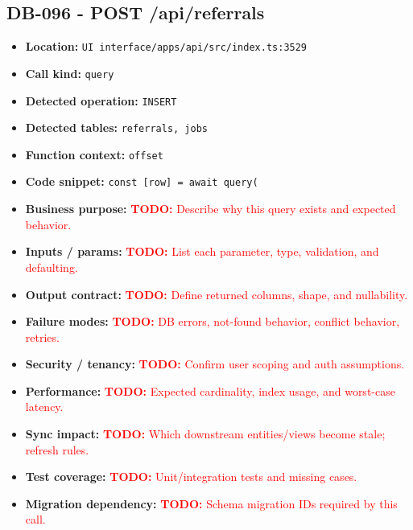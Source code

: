 \documentclass[11pt]{article}
\newcommand{\todoitem}[1]{\textcolor{red}{\textbf{TODO:} #1}}
\begin{document}
\subsection{DB-096 - POST /api/referrals}
\begin{itemize}[leftmargin=1.5em]
\item \textbf{Location:} \texttt{UI interface/apps/api/src/index.ts:3529}
\item \textbf{Call kind:} \texttt{query}
\item \textbf{Detected operation:} \texttt{INSERT}
\item \textbf{Detected tables:} \texttt{referrals, jobs}
\item \textbf{Function context:} \texttt{offset}
\item \textbf{Code snippet:} \texttt{const [row] = await query(}
\item \textbf{Business purpose:} \todoitem{Describe why this query exists and expected behavior.}
\item \textbf{Inputs / params:} \todoitem{List each parameter, type, validation, and defaulting.}
\item \textbf{Output contract:} \todoitem{Define returned columns, shape, and nullability.}
\item \textbf{Failure modes:} \todoitem{DB errors, not-found behavior, conflict behavior, retries.}
\item \textbf{Security / tenancy:} \todoitem{Confirm user scoping and auth assumptions.}
\item \textbf{Performance:} \todoitem{Expected cardinality, index usage, and worst-case latency.}
\item \textbf{Sync impact:} \todoitem{Which downstream entities/views become stale; refresh rules.}
\item \textbf{Test coverage:} \todoitem{Unit/integration tests and missing cases.}
\item \textbf{Migration dependency:} \todoitem{Schema migration IDs required by this call.}
\end{itemize}
\end{document}
